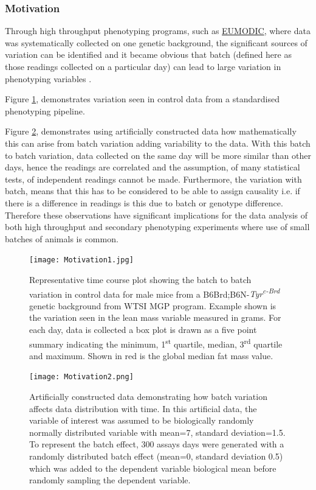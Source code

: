 \documentclass[12pt,a4paper]{article}
\begin{document}
\subsubsection{Motivation}
Through high throughput phenotyping programs, such as \href{http://www.eumodic.org/}{EUMODIC}, where data was systematically collected on one genetic background, the significant sources of variation can be identified and it became obvious that batch (defined here as those readings collected on a particular day) can lead to large variation in phenotyping variables \cite{MM12}.  

Figure \ref{fig:001}, demonstrates variation seen in control data from a standardised phenotyping pipeline. 

Figure \ref{fig:002}, demonstrates using artificially constructed data how mathematically this can arise from batch variation adding variability to the data. With this batch to batch variation, data collected on the same day will be more similar than other days, hence the readings are correlated and the assumption, of many statistical tests, of independent readings cannot be made.  Furthermore, the variation with batch, means that this has to be considered to be able to assign causality i.e. if there is a difference in readings is this due to batch or genotype difference.  Therefore these observations have significant implications for the data analysis of both high throughput and secondary phenotyping experiments where use of small batches of animals is common. 

\begin{figure}[!htpb]%
\centerline{\texttt{[image: Motivation1.jpg]}}
\caption{Representative time course plot showing the batch to batch variation in control data for male mice from a B6Brd;B6N-\textit{Tyr\textsuperscript{c-Brd}} genetic background from WTSI MGP program. Example shown is the variation seen in the lean mass variable measured in grams.   For each day, data is collected a box plot is drawn as a five point summary indicating the minimum, 1\textsuperscript{st} quartile, median, 3\textsuperscript{rd} quartile and maximum. Shown in red is the global median fat mass value.}\label{fig:001}
\end{figure}

\begin{figure}[!htpb]%
\centerline{\texttt{[image: Motivation2.png]}}
\caption{Artificially constructed data demonstrating how batch variation affects data distribution with time.  In this artificial data, the variable of interest was assumed to be biologically randomly normally distributed variable with mean=7, standard deviation=1.5. To represent the batch effect, 300 assays days were generated with a randomly distributed batch effect (mean=0, standard deviation 0.5) which was added to the dependent variable biological mean before randomly sampling the dependent variable. }\label{fig:002}
\end{figure}
\end{document}
